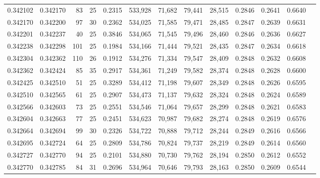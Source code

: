 \begin{tabular}{rrrrrrrrrrrrr}
0.342102 & 0.342170 &    83 &  25 &                                     0.2315 & 533,928 &  71,682 &  79,441 &  28,515 & 0.2846 & 0.2641 & 0.6640 \\
0.342170 & 0.342200 &    97 &  30 &                                     0.2362 & 534,025 &  71,585 &  79,471 &  28,485 & 0.2847 & 0.2639 & 0.6631 \\
0.342201 & 0.342237 &    40 &  25 &                                     0.3846 & 534,065 &  71,545 &  79,496 &  28,460 & 0.2846 & 0.2636 & 0.6627 \\
0.342238 & 0.342298 &   101 &  25 &                                     0.1984 & 534,166 &  71,444 &  79,521 &  28,435 & 0.2847 & 0.2634 & 0.6618 \\
0.342304 & 0.342362 &   110 &  26 &                                     0.1912 & 534,276 &  71,334 &  79,547 &  28,409 & 0.2848 & 0.2632 & 0.6608 \\
0.342362 & 0.342424 &    85 &  35 &                                     0.2917 & 534,361 &  71,249 &  79,582 &  28,374 & 0.2848 & 0.2628 & 0.6600 \\
0.342425 & 0.342510 &    51 &  25 &                                     0.3289 & 534,412 &  71,198 &  79,607 &  28,349 & 0.2848 & 0.2626 & 0.6595 \\
0.342510 & 0.342565 &    61 &  25 &                                     0.2907 & 534,473 &  71,137 &  79,632 &  28,324 & 0.2848 & 0.2624 & 0.6589 \\
0.342566 & 0.342603 &    73 &  25 &                                     0.2551 & 534,546 &  71,064 &  79,657 &  28,299 & 0.2848 & 0.2621 & 0.6583 \\
0.342604 & 0.342663 &    77 &  25 &                                     0.2451 & 534,623 &  70,987 &  79,682 &  28,274 & 0.2848 & 0.2619 & 0.6576 \\
0.342664 & 0.342694 &    99 &  30 &                                     0.2326 & 534,722 &  70,888 &  79,712 &  28,244 & 0.2849 & 0.2616 & 0.6566 \\
0.342695 & 0.342724 &    64 &  25 &                                     0.2809 & 534,786 &  70,824 &  79,737 &  28,219 & 0.2849 & 0.2614 & 0.6560 \\
0.342727 & 0.342770 &    94 &  25 &                                     0.2101 & 534,880 &  70,730 &  79,762 &  28,194 & 0.2850 & 0.2612 & 0.6552 \\
0.342770 & 0.342785 &    84 &  31 &                                     0.2696 & 534,964 &  70,646 &  79,793 &  28,163 & 0.2850 & 0.2609 & 0.6544 \\

\end{tabular}
